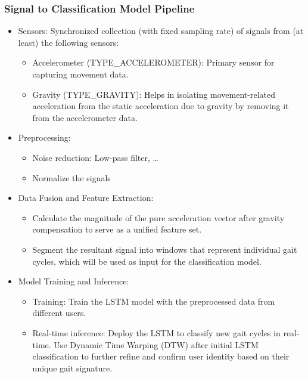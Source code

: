 \documentclass[a4paper,10pt]{article}
\begin{document}
\subsubsection{Signal to Classification Model Pipeline}
\begin{itemize}
    \item Sensors: Synchronized collection (with fixed sampling rate) of signals from (at least) the following sensors: \begin{itemize}
        \item Accelerometer (TYPE\_ACCELEROMETER): Primary sensor for capturing movement data.
        \item Gravity (TYPE\_GRAVITY): Helps in isolating movement-related acceleration from the static acceleration due to gravity by removing it from the accelerometer data.
    \end{itemize}
    \item Preprocessing: \begin{itemize}
        \item Noise reduction: Low-pass filter, \dots
        \item Normalize the signals
    \end{itemize}
    \item Data Fusion and Feature Extraction:
    \begin{itemize}
        \item Calculate the magnitude of the pure acceleration vector after gravity compensation to serve as a unified feature set.
        \item Segment the resultant signal into windows that represent individual gait cycles, which will be used as input for the classification model.
    \end{itemize}
    \item Model Training and Inference:
    \begin{itemize}
        \item Training: Train the LSTM model with the preprocessed data from different users.
        \item Real-time inference: Deploy the LSTM to classify new gait cycles in real-time. Use Dynamic Time Warping (DTW) after initial LSTM classification to further refine and confirm user identity based on their unique gait signature.
    \end{itemize}
\end{itemize}
\end{document}

